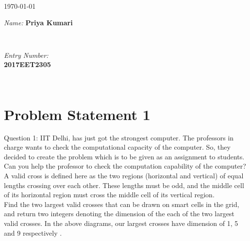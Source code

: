 \documentclass[12pt]{article}
\begin{document}
\begin{titlepage}
{\large \today}\\[3cm] %
 

\begin{minipage}{0.4\textwidth}
\begin{flushleft} \Large
\emph{Name:}
\textbf{Priya Kumari}%
\end{flushleft}
\end{minipage}
~
\begin{minipage}{0.4\textwidth}
\begin{flushright} \Large
\emph{Entry Number:} \\
\textbf{2017EET2305} %
\end{flushright}
\end{minipage}\\[2cm]

\HRule



\vfill %

\end{titlepage}
  
\pagebreak
\tableofcontents
\pagebreak

\section{Problem Statement 1}
{
\textbf{}
Question 1:
IIT Delhi, has just got the strongest computer. The professors in charge wants to check the computational capacity of the computer. So, they decided to create the problem which is to be given as an assignment to students. Can you help the professor to check the computation capability of the computer?
\\
A valid cross is defined here as the two regions (horizontal and vertical) of equal lengths crossing over each other. These lengths must be odd, and the middle cell of its horizontal region must cross the middle cell of its vertical region.
\\
Find the two largest valid crosses that can be drawn on smart cells in the grid, and return two integers denoting the dimension of the each of the two largest valid crosses. In the above diagrams, our largest crosses have dimension of 1,  5 and 9 respectively .
\\
}
\end{document}
